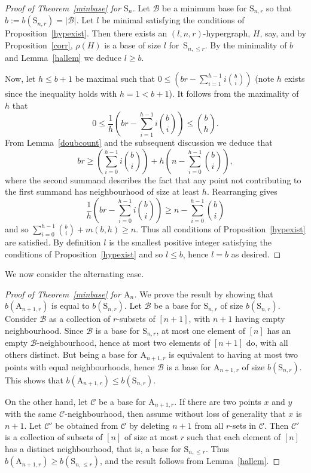 \documentclass[ALCO,published]{cedram}
\renewcommand\S{\mathrm{S}}
\begin{document}
\begin{proof}[Proof of Theorem~\ref{minbase} for $\S_n$]
Let $\mathcal{B}$ be a minimum base for $\S_{n,r}$ so that $b:=b(\S_{n,r})=|\mathcal{B}|$. Let $l$ be minimal satisfying the conditions of Proposition~\ref{hypexist}. Then there exists an $(l,n,r)$-hypergraph, $H$, say, and by Proposition~\ref{corr}, $\rho(H)$ is a base of size $l$ for~$\S_{n,\leq r}$. By the minimality of $b$ and Lemma~\ref{hallem} we deduce $l\geq b$. 

Now, let $h\leq b+1$ be maximal such that $0\leq\left(br-\sum_{i=1}^{h-1}i\binom{b}{i}\right)$ (note $h$ exists since the inequality holds with $h=1<b+1$). It follows from the maximality of $h$ that $$0\leq\frac{1}{h}\left(br-\sum_{i=1}^{h-1}i\binom{b}{i}\right)\leq\binom{b}{h}.$$ From Lemma~\ref{doubcount} and the subsequent discussion we deduce that $$br\geq\left(\sum_{i=0}^{h-1}i\binom{b}{i}\right)+h\left(n-\sum_{i=0}^{h-1}\binom{b}{i}\right),$$ where the second summand describes the fact that any point not contributing to the first summand has neighbourhood of size at least $h$. Rearranging gives $$\frac{1}{h}\left(br-\sum_{i=0}^{h-1}i\binom{b}{i}\right)\geq n-\sum_{i=0}^{h-1}\binom{b}{i}$$ and so $\sum_{i=0}^{h-1}\binom{b}{i}+m(b,h)\geq n$. Thus all conditions of Proposition~\ref{hypexist} are satisfied. By definition $l$ is the smallest positive integer satisfying the conditions of Proposition~\ref{hypexist} and so $l\leq b$, hence $l=b$ as desired.
\end{proof}

We now consider the alternating case.

\begin{proof}[Proof of Theorem~\ref{minbase} for $\mathrm{A}_n$]
We prove the result by showing that $b(\mathrm{A}_{n+1,r})$ is equal to $b(\mathrm{S}_{n,r}).$ Let $\mathcal{B}$ be a base for $\S_{n,r}$ of size $b(\S_{n,r})$. Consider $\mathcal{B}$ as a collection of $r$-subsets of $[n+1]$, with $n+1$ having empty neighbourhood. Since $\mathcal{B}$ is a base for $\S_{n,r}$, at most one element of $[n]$ has an empty $\mathcal{B}$-neighbourhood, hence at most two elements of $[n+1]$ do, with all others distinct. But being a base for $\mathrm{A}_{n+1,r}$ is equivalent to having at most two points with equal neighbourhoods, hence $\mathcal{B}$ is a base for $\mathrm{A}_{n+1,r}$ of size $b(\S_{n,r})$. This shows that $b(\mathrm{A}_{n+1,r})\leq b(\S_{n,r})$.

On the other hand, let $\mathcal{C}$ be a base for $\mathrm{A}_{n+1,r}$. If there are two points $x$ and $y$ with the same $\mathcal{C}$-neighbourhood, then assume without loss of generality that $x$ is $n+1$. Let $\mathcal{C}'$ be obtained from $\mathcal{C}$ by deleting $n+1$ from all $r$-sets in $\mathcal{C}$. Then $\mathcal{C}'$ is a collection of subsets of $[n]$ of size at most $r$ such that each element of $[n]$ has a distinct neighbourhood, that is, a base for $\S_{n,\leq r}$. Thus $b(\mathrm{A}_{n+1,r})\geq b(\S_{n,\leq r})$, and the result follows from Lemma~\ref{hallem}.
\end{proof}
\end{document}
